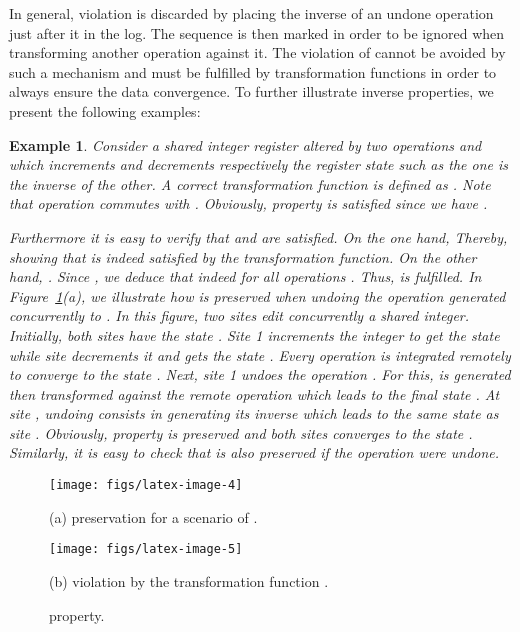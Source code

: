 \documentclass[submission,copyright,creativecommons]{eptcs}
\newtheorem{example}{Example}
\begin{document}
In general,  violation is discarded by placing the inverse of an undone operation  just after it in the log. The sequence  is then marked in order to be ignored when transforming another operation against it. The violation of  cannot be avoided by such a mechanism and must be fulfilled by transformation functions in order to always ensure the data convergence.
To further illustrate inverse properties, we present the following examples:
 
\begin{example}\label{exmp:incDec}
Consider a shared integer register altered by two operations  and  which increments and decrements respectively the register state such as the one is the inverse of the other. A correct transformation function is defined as .  Note that operation  commutes with . Obviously, property  is satisfied since we have .

Furthermore it is easy to verify that  and  are satisfied. On the one hand, 
Thereby, showing that   is indeed satisfied by the transformation function.
On the other hand, . 
Since ,  
we  deduce that   indeed  for all operations . Thus,   is fulfilled. In Figure~\ref{fig:ip3}(a), we illustrate how  is preserved when undoing the operation  generated concurrently to . In this figure,  two sites  edit concurrently a shared integer. Initially, both sites have the state . Site 1 increments the integer to get the state  while site  decrements it and gets the state . Every operation is integrated remotely to converge to the state . Next, site 1 undoes the operation . For this,    is generated then transformed against the remote operation  which leads to the final state . At site , undoing  consists in generating its inverse  which leads to the same state as site . Obviously, property  is preserved and both sites converges to the state .  Similarly, it is easy to check that  is also preserved if the operation  were undone.
\end{example}
\begin{figure}[htbp]
\begin{minipage}[t]{0.50\linewidth}
\begin{tiny}
\centerline{\texttt{[image: figs/latex-image-4]}}
\end{tiny}
\begin{small}
\centerline{(a)  preservation for a scenario of .} 
\end{small}
\end{minipage}
\begin{minipage}[t]{0.50\linewidth}
\centerline{\texttt{[image: figs/latex-image-5]}}
\begin{small}
\centerline{(b)  violation by the transformation function .}
\end{small}
\end{minipage}
\caption{ property.}\label{fig:ip3}
\end{figure}
\end{document}
